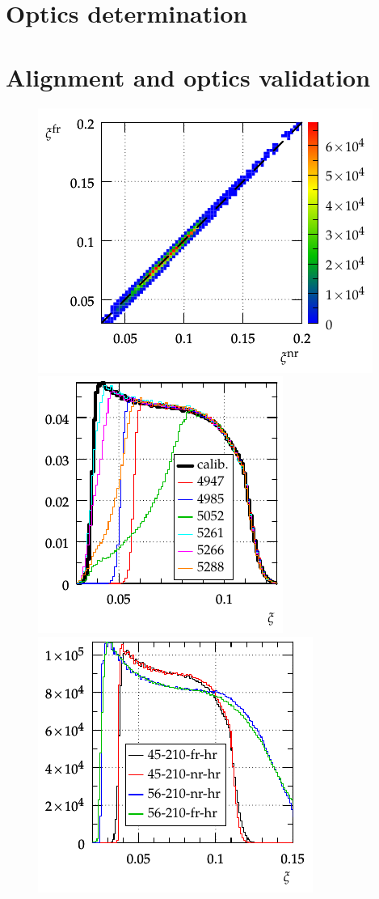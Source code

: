 \documentclass{article}
\begin{document}
\section{Optics determination}
\label{s:optics}



\section{Alignment and optics validation}
\label{s:validataion}

\begin{figure}[h!]
\begin{center}
\hskip-15mm
\includegraphics{fig/summary/xi_NF_corr_cmp.pdf}
\includegraphics{fig/summary/xi_cmp_run.pdf}
\includegraphics{fig/summary/xi_cmp_rp.pdf}

\end{center}
\end{figure}
\end{document}

